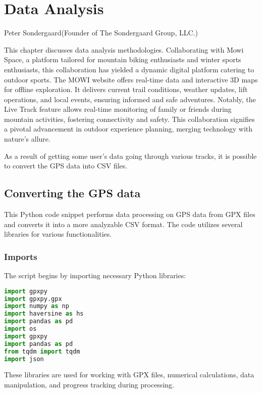 %
\chapter{Data Analysis}
\label{sec:data}

{Peter Sondergaard}{(Founder of The Sondergaard Group, LLC.)}


This chapter discusses data analysis methodologies. Collaborating with Mowi Space, a platform tailored for mountain biking enthusiasts and winter sports enthusiasts, this collaboration has yielded a dynamic digital platform catering to outdoor sports. The MOWI website offers real-time data and interactive 3D maps for offline exploration. It delivers current trail conditions, weather updates, lift operations, and local events, ensuring informed and safe adventures. Notably, the Live Track feature allows real-time monitoring of family or friends during mountain activities, fostering connectivity and safety. This collaboration signifies a pivotal advancement in outdoor experience planning, merging technology with nature's allure.

As a result of getting some user's data going through various tracks,
it is possible to convert the GPS data into CSV files.


\section{Converting the GPS data}
\label{sec:data-gps}

This Python code snippet performs data processing on GPS data from GPX files and converts it into 
a more analyzable CSV format. The code utilizes several libraries for various functionalities.

\subsection{Imports}

The script begins by importing necessary Python libraries:

\begin{lstlisting}[language=Python]
import gpxpy
import gpxpy.gpx
import numpy as np
import haversine as hs
import pandas as pd
import os
import gpxpy
import pandas as pd
from tqdm import tqdm
import json
\end{lstlisting}

These libraries are used for working with GPX files, numerical calculations, data manipulation, and progress tracking during processing.

